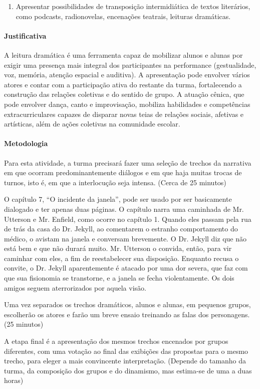 \documentclass[12pt]{extarticle}
\begin{document}
{\begin{enumerate}
\item
Apresentar possibilidades de transposição intermidiática
de textos literários, como podcasts, radionovelas, encenações teatrais,
leituras dramáticas.
\end{enumerate}

\paragraph{Justificativa}
A leitura dramática é uma ferramenta capaz de mobilizar alunos e alunas
por exigir uma presença mais integral dos participantes na performance
(gestualidade, voz, memória, atenção espacial e auditiva). A
apresentação pode envolver vários atores e contar com a participação
ativa do restante da turma, fortalecendo a construção das relações
coletivas e do sentido de grupo. A atuação cênica, que pode envolver
dança, canto e improvisação, mobiliza habilidades e competências
extracurriculares capazes de disparar novas teias de relações sociais,
afetivas e artísticas, além de ações coletivas na comunidade escolar.

\paragraph{Metodologia}
Para esta atividade, a turma precisará fazer uma seleção de trechos da
narrativa em que ocorram predominantemente diálogos e em que haja muitas
trocas de turnos, isto é, em que a interlocução seja intensa. (Cerca de
25 minutos)

O capítulo 7, ``O incidente da janela'', pode ser usado por ser
basicamente dialogado e ter apenas duas páginas. O capítulo narra uma
caminhada de Mr. Utterson e Mr. Enfield, como ocorre no capítulo 1.
Quando eles passam pela rua de trás da casa do Dr. Jekyll, ao comentarem
o estranho comportamento do médico, o avistam na janela e conversam
brevemente. O Dr. Jekyll diz que não está bem e que não durará muito.
Mr. Utterson o convida, então, para vir caminhar com eles, a fim de
reestabelecer sua disposição. Enquanto recusa o convite, o Dr. Jekyll
aparentemente é atacado por uma dor severa, que faz com que sua
fisionomia se transtorne, e a janela se fecha violentamente. Os dois
amigos seguem aterrorizados por aquela visão.

Uma vez separados os trechos dramáticos, alunos e alunas, em pequenos
grupos, escolherão os atores e farão um breve ensaio treinando as falas
dos personagens. (25 minutos)

A etapa final é a apresentação dos mesmos trechos encenados por grupos
diferentes, com uma votação ao final das exibições das propostas para o
mesmo trecho, para eleger a mais convincente interpretação. (Depende do
tamanho da turma, da composição dos grupos e do dinamismo, mas estima-se
de uma a duas horas)

}
\end{document}
